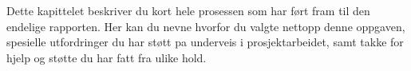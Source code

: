 Dette kapittelet beskriver du kort hele prosessen som har ført fram til den endelige rapporten. Her kan du nevne hvorfor du valgte nettopp denne oppgaven, spesielle utfordringer du har støtt pa underveis i prosjektarbeidet, samt takke for hjelp og støtte du har fatt fra ulike hold.
